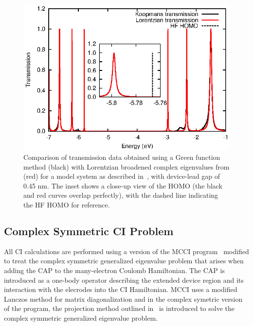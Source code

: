 \begin{figure} 
	\begin{center}
		\includegraphics[width=0.9\linewidth]{figures/figure3}
	\end{center}
	\caption{Comparison of transmission data obtained using a Green
	function method	(black) with Lorentzian broadened complex eigenvalues
	from  (red) for a model system as described
	in~, with device-lead gap of 0.45 nm.
	The inset shows a close-up view of the \ac{HOMO} (the black and red
	curves overlap perfectly), with the dashed line indicating the HF
	\ac{HOMO} for reference.
	}
	\label{fig:13evals}
\end{figure}

\subsection{Complex Symmetric \ac{CI} Problem}

All \ac{CI} calculations  are performed using a version of the \ac{MCCI}
program~\cite{mcci1995, mcci1998} modified to treat the complex
symmetric generalized eigenvalue problem that arises when adding the
\ac{CAP} to the many-electron Coulomb Hamiltonian. The \ac{CAP} is
introduced as a one-body operator describing the extended device region 
and its interaction with the elecrodes into the \ac{CI} Hamiltonian. 
\ac{MCCI} uses a modified Lanczos method for matrix diagonalization and
in the complex symetric version of the program, the projection method
outlined in~\cite{tarantelli_csd} is introduced to solve the complex
symmetric generalized eigenvalue problem. 

